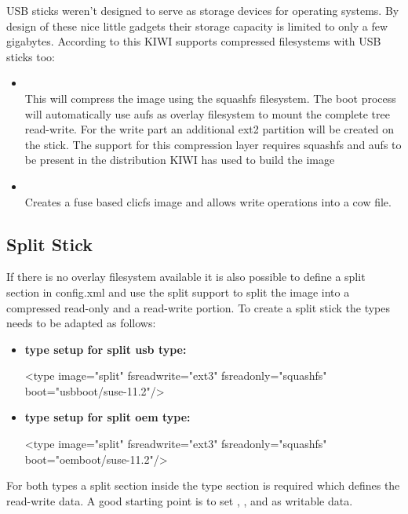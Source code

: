 USB sticks weren't designed to serve as storage devices for
operating systems. By design of these nice little gadgets their
storage capacity is limited to only a few gigabytes. According to
this KIWI supports compressed filesystems with USB sticks too:  

\begin{itemize}
\item {}\\
      This will compress the image using the squashfs filesystem. The
      boot process will automatically use aufs as overlay filesystem to
      mount the complete tree read-write. For the write part an additional
      ext2 partition will be created on the stick. The support for this
      compression layer requires squashfs and aufs to be present in
      the distribution KIWI has used to build the image 
\item {}\\
      Creates a fuse based clicfs image and allows write operations
      into a cow file.
\end{itemize}

\subsection{Split Stick}
If there is no overlay filesystem available it is also possible to
define a split section in config.xml and use the split support to
split the image into a compressed read-only and a read-write portion.
To create a split stick the types needs to be adapted as follows:

\begin{itemize}
\item \textbf{type setup for split usb type:}

\begin{xml}
<type image="split" fsreadwrite="ext3" fsreadonly="squashfs"
      boot="usbboot/suse-11.2"/>
\end{xml}
\item \textbf{type setup for split oem type:}

\begin{xml}
<type image="split" fsreadwrite="ext3" fsreadonly="squashfs"
      boot="oemboot/suse-11.2"/>
\end{xml}
\end{itemize}

For both types a split section inside the type section is required
which defines the read-write data. A good starting point is
to set , , and  as writable data.

